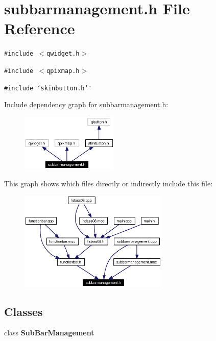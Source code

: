 \section{subbarmanagement.h File Reference}
\label{subbarmanagement_8h}


{\tt \#include $<$qwidget.h$>$}\par
{\tt \#include $<$qpixmap.h$>$}\par
{\tt \#include \char`\"{}skinbutton.h\char`\"{}}\par


Include dependency graph for subbarmanagement.h:\begin{figure}[H]
\begin{center}
\leavevmode
\includegraphics[width=131pt]{subbarmanagement_8h__incl}
\end{center}
\end{figure}


This graph shows which files directly or indirectly include this file:\begin{figure}[H]
\begin{center}
\leavevmode
\includegraphics[width=201pt]{subbarmanagement_8h__dep__incl}
\end{center}
\end{figure}
\subsection*{Classes}
\begin{CompactItemize}
\item 
class {\bf Sub\-Bar\-Management}
\end{CompactItemize}
